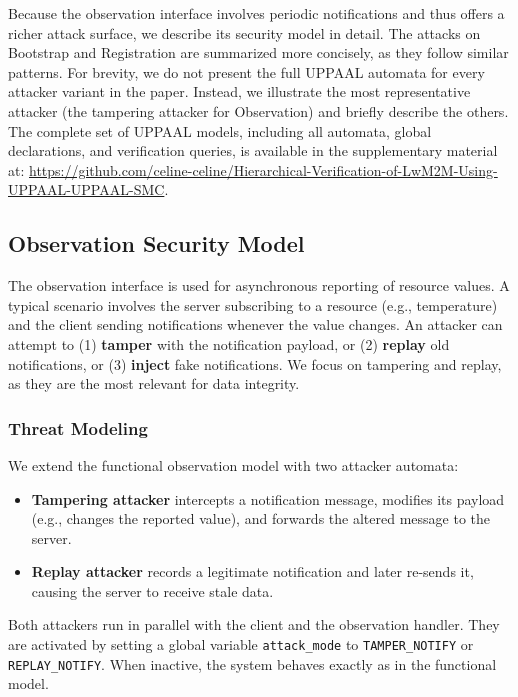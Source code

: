 \documentclass[a4paper,fleqn]{cas-sc}
\begin{document}
Because the observation interface involves periodic notifications and thus offers a richer attack surface, we describe its security model in detail. The attacks on Bootstrap and Registration are summarized more concisely, as they follow similar patterns. For brevity, we do not present the full UPPAAL automata for every attacker variant in the paper. Instead, we illustrate the most representative attacker (the tampering attacker for Observation) and briefly describe the others. The complete set of UPPAAL models, including all automata, global declarations, and verification queries, is available in the supplementary material at: \url{https://github.com/celine-celine/Hierarchical-Verification-of-LwM2M-Using-UPPAAL-UPPAAL-SMC}.

\subsection{Observation Security Model}
The observation interface is used for asynchronous reporting of resource values. A typical scenario involves the server subscribing to a resource (e.g., temperature) and the client sending notifications whenever the value changes. An attacker can attempt to (1) \textbf{tamper} with the notification payload, or (2) \textbf{replay} old notifications, or (3) \textbf{inject} fake notifications. We focus on tampering and replay, as they are the most relevant for data integrity.

\subsubsection{Threat Modeling} 
We extend the functional observation model with two attacker automata:
\begin{itemize}
    \item \textbf{Tampering attacker} intercepts a notification message, modifies its payload (e.g., changes the reported value), and forwards the altered message to the server.
    \item \textbf{Replay attacker} records a legitimate notification and later re-sends it, causing the server to receive stale data.
\end{itemize}

Both attackers run in parallel with the client and the observation handler. They are activated by setting a global variable \texttt{attack\_mode} to \texttt{TAMPER\_NOTIFY} or \texttt{REPLAY\_NOTIFY}. When inactive, the system behaves exactly as in the functional model.
\end{document}
